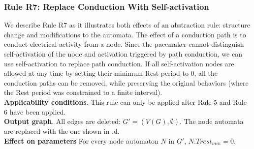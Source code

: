 \subsubsection{Rule R7: Replace Conduction With Self-activation}
We describe Rule R7 as it illustrates both effects of an abstraction rule: structure change and modifications to the automata.
The effect of a conduction path is to conduct electrical activity from a node. Since the pacemaker cannot distinguish self-activation of the node and activation triggered by path conduction, we can use self-activation to replace path conduction.
If all self-activation nodes are allowed at any time by setting their minimum Rest period to 0, all the conduction paths can be removed, while preserving the original behaviors (where the Rest period was constrained to a finite interval).\\
\textbf{Applicability conditions}.
This rule can only be applied after Rule 5 and Rule 6 have been applied.\\
\textbf{Output graph}.
All edges are deleted: $G' = (V(G), \emptyset)$. The node automata are replaced with the one shown in .d.\\
\textbf{Effect on parameters}
For every node automaton $N$ in $G'$, $N.Trest_{min}=0$.\\


